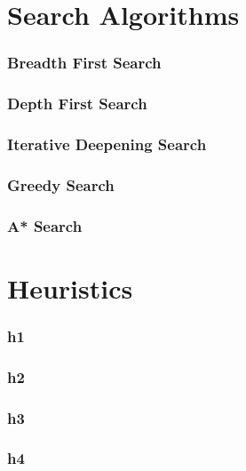 \documentclass[14pt,a4paper]{report}
\begin{document}
\part{Search Algorithms}
\section{Breadth First Search}
\section{Depth First Search}
\section{Iterative Deepening Search}
\section{Greedy Search}
\section{A* Search}

\part{Heuristics}
\section{h1}
\section{h2}
\section{h3}
\section{h4}
\end{document}
